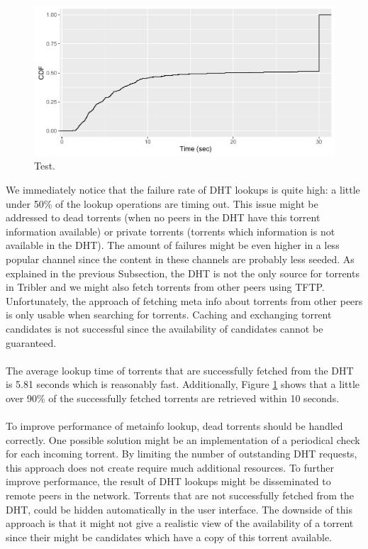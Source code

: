\begin{figure}[!h]
	\centering
	\includegraphics[width=0.9\columnwidth]{images/experiments/metainfo_fetch}
	\caption{Test.}
	\label{fig:metainfo_fetch}
\end{figure}

We immediately notice that the failure rate of DHT lookups is quite high: a little under 50\% of the lookup operations are timing out. This issue might be addressed to dead torrents (when no peers in the DHT have this torrent information available) or private torrents (torrents which information is not available in the DHT). The amount of failures might be even higher in a less popular channel since the content in these channels are probably less seeded. As explained in the previous Subsection, the DHT is not the only source for torrents in Tribler and we might also fetch torrents from other peers using TFTP. Unfortunately, the approach of fetching meta info about torrents from other peers is only usable when searching for torrents. Caching and exchanging torrent candidates is not successful since the availability of candidates cannot be guaranteed.\\\\
The average lookup time of torrents that are successfully fetched from the DHT is 5.81 seconds which is reasonably fast. Additionally, Figure \ref{fig:metainfo_fetch} shows that a little over 90\% of the successfully fetched torrents are retrieved within 10 seconds.\\\\
To improve performance of metainfo lookup, dead torrents should be handled correctly. One possible solution might be an implementation of a periodical check for each incoming torrent. By limiting the number of outstanding DHT requests, this approach does not create require much additional resources. To further improve performance, the result of DHT lookups might be disseminated to remote peers in the network. Torrents that are not successfully fetched from the DHT, could be hidden automatically in the user interface. The downside of this approach is that it might not give a realistic view of the availability of a torrent since their might be candidates which have a copy of this torrent available.